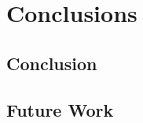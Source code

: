 \documentclass[12pt, a4paper]{report}
\begin{document}

\chapter{Conclusions}

\section{Conclusion}

\section{Future Work}









\end{document}
